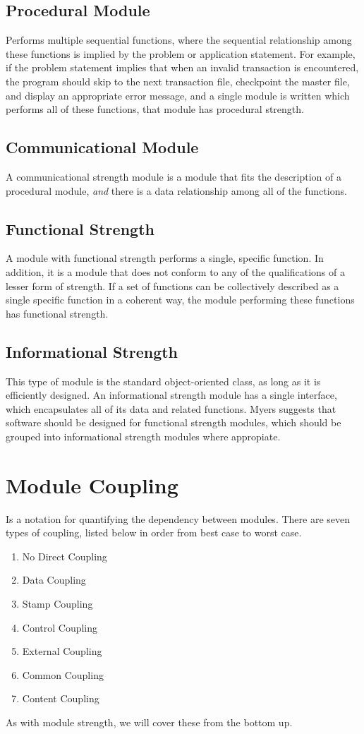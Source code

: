 \documentclass[format.tex]{subfiles}
\begin{document}
\subsection{Procedural Module}
Performs multiple sequential functions, where the sequential relationship
among these functions is implied by the problem or application statement. For
example, if the problem statement implies that when an invalid transaction is
encountered, the program should skip to the next transaction file, checkpoint
the master file, and display an appropriate error message, and a single
module is written which performs all of these functions, that module has
procedural strength.

\subsection{Communicational Module}
A communicational strength module is a module that fits the description of a
procedural module, {\it and} there is a data relationship among all of the
functions.

\subsection{Functional Strength}
A module with functional strength performs a single, specific function. In
addition, it is a module that does not conform to any of the qualifications of
a lesser form of strength. If a set of functions can be collectively described
as a single specific function in a coherent way, the module performing these
functions has functional strength.

\subsection{Informational Strength}
This type of module is the standard object-oriented class, as long as it is
efficiently designed. An informational strength module has a single interface,
which encapsulates all of its data and related functions. Myers suggests that
software should be designed for functional strength modules, which should be
grouped into informational strength modules where appropiate.

\section{Module Coupling}
Is a notation for quantifying the dependency between modules. There are seven
types of coupling, listed below in order from best case to worst case.
\begin{enumerate}
\item No Direct Coupling
\item Data Coupling
\item Stamp Coupling
\item Control Coupling
\item External Coupling
\item Common Coupling
\item Content Coupling
\end{enumerate}
As with module strength, we will cover these from the bottom up.
\end{document}
